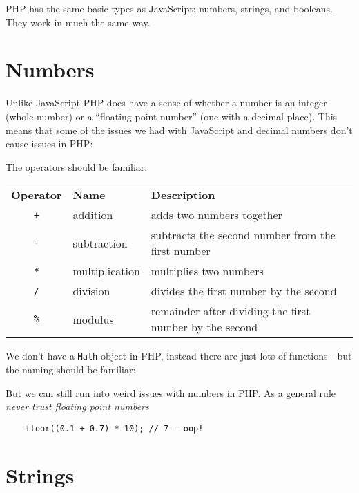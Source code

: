 PHP has the same basic types as JavaScript: numbers, strings, and booleans. They work in much the same way.


\section{Numbers}

Unlike JavaScript PHP does have a sense of whether a number is an integer (whole number) or a ``floating point number'' (one with a decimal place). This means that some of the issues we had with JavaScript and decimal numbers don't cause issues in PHP:



The operators should be familiar:
\\

\begin{small}
    \begin{tabu}{c l X}
        \textbf{Operator} & \textbf{Name} & \textbf{Description} \\
        \texttt{+}  & addition        & adds two numbers together \\
        \texttt{-}  & subtraction     & subtracts the second number from the first number \\
        \texttt{*}  & multiplication  & multiplies two numbers \\
        \texttt{/}  & division        & divides the first number by the second \\
        \texttt{\%} & modulus         & remainder after dividing the first number by the second
    \end{tabu}
\end{small}

\par\bigskip


We don't have a \texttt{Math} object in PHP, instead there are just lots of functions - but the naming should be familiar:



But we can still run into weird issues with numbers in PHP. As a general rule \textit{never trust floating point numbers}

\begin{verbatim}
    floor((0.1 + 0.7) * 10); // 7 - oop!
\end{verbatim}


\section{Strings}

